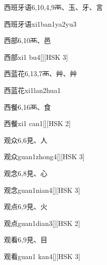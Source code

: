 \begin{entry}{西班牙语}{6,10,4,9}{⾑、⽟、⽛、⾔}
  \begin{phonetics}{西班牙语}{xi1ban1ya2yu3}
  \end{phonetics}
\end{entry}

\begin{entry}{西部}{6,10}{⾑、⾢}
  \begin{phonetics}{西部}{xi1 bu4}[][HSK 3]
  \end{phonetics}
\end{entry}

\begin{entry}{西蓝花}{6,13,7}{⾑、⾋、⾋}
  \begin{phonetics}{西蓝花}{xi1lan2hua1}
  \end{phonetics}
\end{entry}

\begin{entry}{西餐}{6,16}{⾑、⾷}
  \begin{phonetics}{西餐}{xi1 can1}[][HSK 2]
  \end{phonetics}
\end{entry}

\begin{entry}{观众}{6,6}{⾒、⼈}
  \begin{phonetics}{观众}{guan1zhong4}[][HSK 3]
  \end{phonetics}
\end{entry}

\begin{entry}{观念}{6,8}{⾒、⼼}
  \begin{phonetics}{观念}{guan1nian4}[][HSK 3]
  \end{phonetics}
\end{entry}

\begin{entry}{观点}{6,9}{⾒、⽕}
  \begin{phonetics}{观点}{guan1dian3}[][HSK 2]
  \end{phonetics}
\end{entry}

\begin{entry}{观看}{6,9}{⾒、⽬}
  \begin{phonetics}{观看}{guan1 kan4}[][HSK 3]
  \end{phonetics}
\end{entry}

